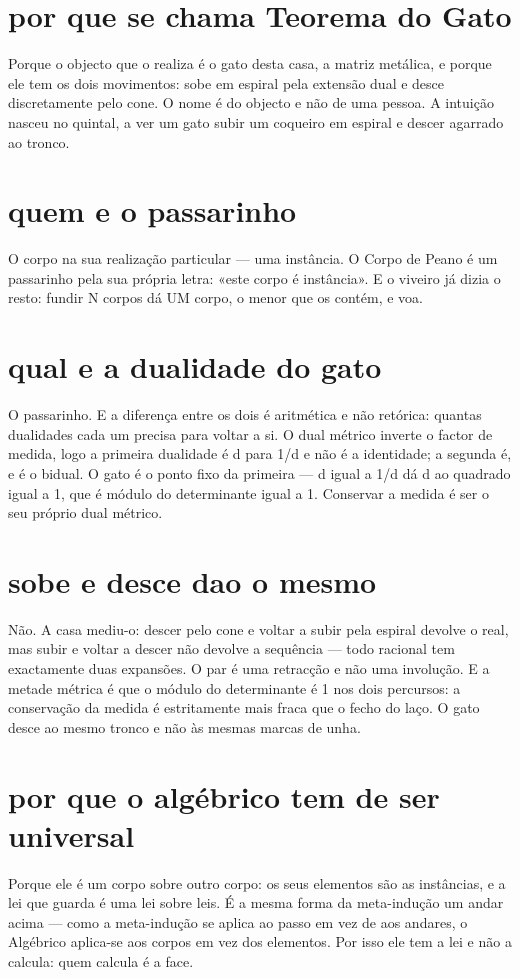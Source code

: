 \documentclass[11pt,a4paper]{article}
\begin{document}
\section{por que se chama Teorema do Gato}
Porque o objecto que o realiza é o gato desta casa, a matriz metálica, e porque ele tem
os dois movimentos: sobe em espiral pela extensão dual e desce discretamente pelo cone.
O nome é do objecto e não de uma pessoa. A intuição nasceu no quintal, a ver um gato
subir um coqueiro em espiral e descer agarrado ao tronco.

\section{quem e o passarinho}
O corpo na sua realização particular — uma instância. O Corpo de Peano é um passarinho
pela sua própria letra: «este corpo é instância». E o viveiro já dizia o resto: fundir N
corpos dá UM corpo, o menor que os contém, e voa.

\section{qual e a dualidade do gato}
O passarinho. E a diferença entre os dois é aritmética e não retórica: quantas dualidades
cada um precisa para voltar a si. O dual métrico inverte o factor de medida, logo a
primeira dualidade é d para 1/d e não é a identidade; a segunda é, e é o bidual. O gato é
o ponto fixo da primeira — d igual a 1/d dá d ao quadrado igual a 1, que é módulo do
determinante igual a 1. Conservar a medida é ser o seu próprio dual métrico.

\section{sobe e desce dao o mesmo}
Não. A casa mediu-o: descer pelo cone e voltar a subir pela espiral devolve o real, mas
subir e voltar a descer não devolve a sequência — todo racional tem exactamente duas
expansões. O par é uma retracção e não uma involução. E a metade métrica é que o módulo
do determinante é 1 nos dois percursos: a conservação da medida é estritamente mais fraca
que o fecho do laço. O gato desce ao mesmo tronco e não às mesmas marcas de unha.

\section{por que o algébrico tem de ser universal}
Porque ele é um corpo sobre outro corpo: os seus elementos são as instâncias, e a lei que
guarda é uma lei sobre leis. É a mesma forma da meta-indução um andar acima — como a
meta-indução se aplica ao passo em vez de aos andares, o Algébrico aplica-se aos corpos
em vez dos elementos. Por isso ele tem a lei e não a calcula: quem calcula é a face.
\end{document}

